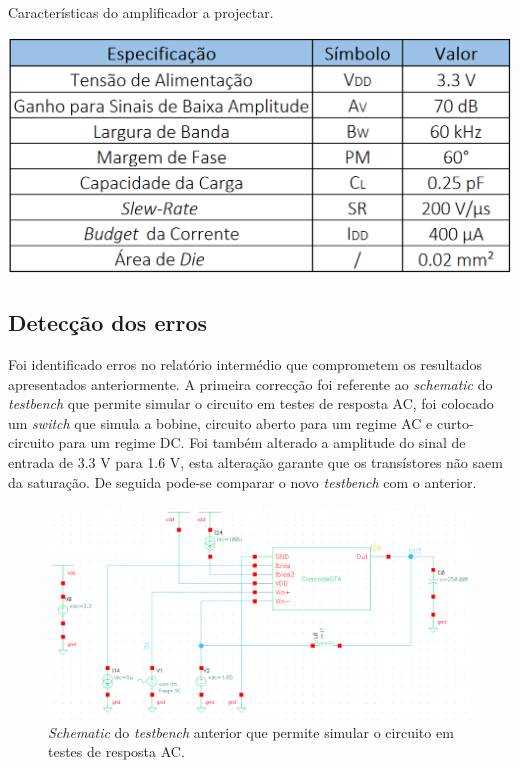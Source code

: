 \documentclass[11pt]{article}
\numberwithin{equation}{section}
\begin{document}
\begin{table}[H]
	\centering
	\caption{Características do amplificador a projectar.}
	\vspace{-1.5mm}
	\includegraphics[keepaspectratio=true, scale=0.45]{teoricas/tabela1}
\end{table}


\subsection{Detecção dos erros} 

Foi identificado erros no relatório intermédio que comprometem os resultados apresentados anteriormente. A primeira correcção foi referente ao \textit{schematic} do \textit{testbench} que permite simular o circuito em testes de resposta AC, foi colocado um \textit{switch} que simula a bobine, circuito aberto para um regime AC e curto-circuito para um regime DC. Foi também alterado a amplitude do sinal de entrada de 3.3 V para 1.6 V, esta alteração garante que os transístores não saem da saturação. De seguida pode-se comparar o novo \textit{testbench} com o anterior.

\begin{figure}[H]
	\centering
	\includegraphics[keepaspectratio=true, scale=0.60]{exps/TBac}
	\vspace{-0.5em}
	\caption{\textit{Schematic} do \textit{testbench} anterior que permite simular o circuito em testes de resposta AC.}
	\vspace{-0.8em}
\end{figure} 
\end{document}

